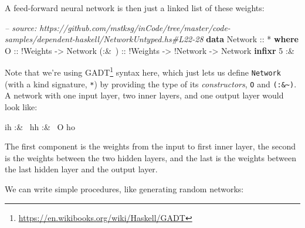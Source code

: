 \documentclass[]{article}
\newenvironment{Shaded}{}{}
\newcommand{\KeywordTok}[1]{\textcolor[rgb]{0.00,0.44,0.13}{\textbf{{#1}}}}
\newcommand{\DataTypeTok}[1]{\textcolor[rgb]{0.56,0.13,0.00}{{#1}}}
\newcommand{\DecValTok}[1]{\textcolor[rgb]{0.25,0.63,0.44}{{#1}}}
\newcommand{\CommentTok}[1]{\textcolor[rgb]{0.38,0.63,0.69}{\textit{{#1}}}}
\newcommand{\OtherTok}[1]{\textcolor[rgb]{0.00,0.44,0.13}{{#1}}}
\newcommand{\FunctionTok}[1]{\textcolor[rgb]{0.02,0.16,0.49}{{#1}}}
\newcommand{\NormalTok}[1]{{#1}}
\renewcommand{\href}[2]{#2\footnote{\url{#1}}}
\begin{document}
A feed-forward neural network is then just a linked list of these
weights:

\begin{Shaded}
\begin{Highlighting}[]
\CommentTok{-- source: https://github.com/mstksg/inCode/tree/master/code-samples/dependent-haskell/NetworkUntyped.hs#L22-28}
\KeywordTok{data} \DataTypeTok{Network}\OtherTok{ ::} \FunctionTok{*} \KeywordTok{where}
    \DataTypeTok{O}\OtherTok{     ::} \FunctionTok{!}\DataTypeTok{Weights}
          \OtherTok{->} \DataTypeTok{Network}
\OtherTok{    (:&~) ::} \FunctionTok{!}\DataTypeTok{Weights}
          \OtherTok{->} \FunctionTok{!}\DataTypeTok{Network}
          \OtherTok{->} \DataTypeTok{Network}
\KeywordTok{infixr} \DecValTok{5} \FunctionTok{:&~}
\end{Highlighting}
\end{Shaded}

Note that we're using
\href{https://en.wikibooks.org/wiki/Haskell/GADT}{GADT} syntax here,
which just lets us define \texttt{Network} (with a kind signature,
\texttt{*}) by providing the type of its \emph{constructors}, \texttt{O}
and \texttt{(:\&\textasciitilde{})}. A network with one input layer, two
inner layers, and one output layer would look like:

\begin{Shaded}
\begin{Highlighting}[]
\NormalTok{ih }\FunctionTok{:&~} \NormalTok{hh }\FunctionTok{:&~} \DataTypeTok{O} \NormalTok{ho}
\end{Highlighting}
\end{Shaded}

The first component is the weights from the input to first inner layer,
the second is the weights between the two hidden layers, and the last is
the weights between the last hidden layer and the output layer.

We can write simple procedures, like generating random networks:
\end{document}
